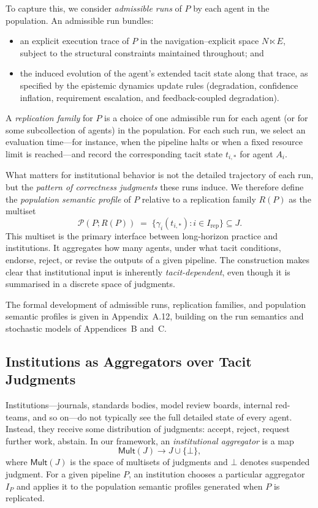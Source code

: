 To capture this, we consider \emph{admissible runs} of $P$ by each agent in the population. An admissible run bundles:
\begin{itemize}
  \item an explicit execution trace of $P$ in the navigation--explicit space $N \ltimes E$, subject to the structural constraints maintained throughout; and
  \item the induced evolution of the agent's extended tacit state along that trace, as specified by the epistemic dynamics update rules (degradation, confidence inflation, requirement escalation, and feedback-coupled degradation).
\end{itemize}

A \emph{replication family} for $P$ is a choice of one admissible run for each agent (or for some subcollection of agents) in the population. For each such run, we select an evaluation time---for instance, when the pipeline halts or when a fixed resource limit is reached---and record the corresponding tacit state $t_{i,*}$ for agent $A_i$.

What matters for institutional behavior is not the detailed trajectory of each run, but the \emph{pattern of correctness judgments} these runs induce. We therefore define the \emph{population semantic profile} of $P$ relative to a replication family $R(P)$ as the multiset
\[
  \mathcal{P}(P; R(P)) \;=\; \{ \gamma_i(t_{i,*}) : i \in I_{\mathrm{rep}} \} \subseteq J.
\]
This multiset is the primary interface between long-horizon practice and institutions. It aggregates how many agents, under what tacit conditions, endorse, reject, or revise the outputs of a given pipeline. The construction makes clear that institutional input is inherently \emph{tacit-dependent}, even though it is summarised in a discrete space of judgments.

The formal development of admissible runs, replication families, and population semantic profiles is given in Appendix~A.12, building on the run semantics and stochastic models of Appendices~B and~C.

\subsection{Institutions as Aggregators over Tacit Judgments}

Institutions---journals, standards bodies, model review boards, internal red-teams, and so on---do not typically see the full detailed state of every agent. Instead, they receive some distribution of judgments: accept, reject, request further work, abstain. In our framework, an \emph{institutional aggregator} is a map
\[
  \mathsf{Mult}(J) \to J \cup \{\bot\},
\]
where $\mathsf{Mult}(J)$ is the space of multisets of judgments and $\bot$ denotes suspended judgment. For a given pipeline $P$, an institution chooses a particular aggregator $I_P$ and applies it to the population semantic profiles generated when $P$ is replicated.


